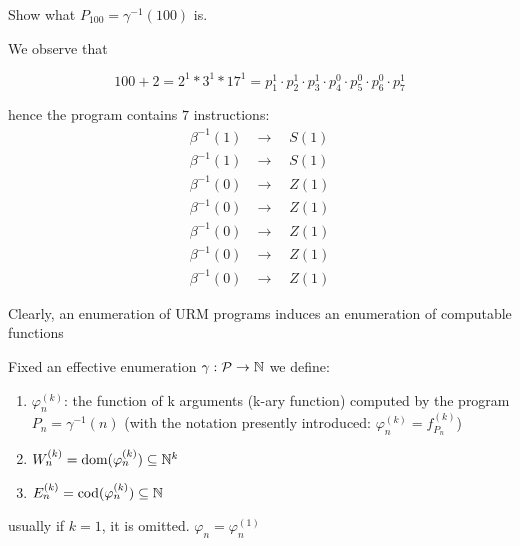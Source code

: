 \begin{example}
  Show what $P_{100} = \gamma^{-1}(100)$ is.

  We observe that %



  \[100 + 2 = 2^1 * 3^1 * 17^1 = p_1^1 \cdot p_2^1 \cdot p_3^1 \cdot
    p_4^0 \cdot p_5^0 \cdot p_6^0 \cdot p_7^1 \]

  hence the program contains $7$ instructions:
  \[
    \begin{split}
      \beta^{-1}(1) & \to \quad S(1) \\
      \beta^{-1}(1) & \to \quad S(1) \\
      \beta^{-1}(0) & \to \quad Z(1) \\
      \beta^{-1}(0) & \to \quad Z(1) \\
      \beta^{-1}(0) & \to \quad Z(1) \\
      \beta^{-1}(0) & \to \quad Z(1) \\
      \beta^{-1}(0) & \to \quad Z(1)
    \end{split}
  \]
\end{example}

Clearly, an enumeration of URM programs induces an enumeration of computable functions

\begin{definition}
  Fixed an effective enumeration
  $\gamma : \mathcal{P} \to \mathbb{N}$ we define:
  \begin{enumerate}[label=\arabic*.]
  \item $\varphi_n^{(k)}$: the function of k arguments (k-ary
    function) computed by the program $P_n = \gamma^{-1}(n)$ (with
    the notation presently introduced: $\varphi_n^{(k)} = f_{P_n}^{(k)}$)
  \item $W_n^{(k)} = \mbox{dom}(\varphi_n^{(k)}) \subseteq \mathbb{N}^k $
  \item $E_n^{(k)} = \mbox{cod}(\varphi_n^{(k)}) \subseteq \mathbb{N}$
  \end{enumerate}

  usually if $k=1$, it is omitted. $\varphi_n = \varphi_n^{(1)}$
\end{definition}

